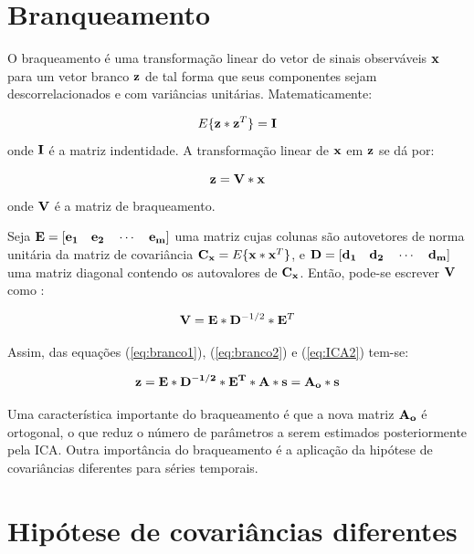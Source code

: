 \documentclass[a4paper,12pt]{monografia}
\theoremstyle{plain}
\theoremstyle{definition}
\theoremstyle{remark}
\begin{document}
\section{Branqueamento}

 O braqueamento é uma transformação linear do vetor de sinais observáveis ${\bf x}$ para um vetor branco ${\bf z}$ de tal forma que seus componentes sejam descorrelacionados e com variâncias unitárias. Matematicamente:

\begin{equation}
    E\{{\bf z}*{\bf z}^{T}\}= {\bf I} 
    \label{eq:branco1}
\end{equation}
onde ${\bf I}$ é a matriz indentidade. A transformação linear de ${\bf x}$ em ${\bf z}$ se dá por:

\begin{equation}
    {\bf z}= {\bf V}*{\bf x} 
    \label{eq:branco1}
\end{equation}
onde ${\bf V}$ é a matriz de braqueamento. 

Seja ${\bf E=[e_{1} \quad e_{2}\quad \cdots \quad e_{m}]}$ uma matriz cujas colunas são autovetores de norma unitária da matriz de covariância ${\bf C_{x}}=E\{{\bf x*x}^{T}\}$, e ${\bf D=[d_{1} \quad d_{2} \quad \cdots \quad d_{m}]}$ uma matriz diagonal contendo os autovalores de ${\bf C_{x}}$. Então, pode-se escrever ${\bf V}$ como \cite{hyvarinen2004independent}:

\begin{equation}
    {\bf V}= {\bf E}*{\bf D}^{-1/2}*{\bf E}^{T} 
    \label{eq:branco2}
\end{equation}

Assim, das equações (\ref{eq:branco1}), (\ref{eq:branco2}) e (\ref{eq:ICA2}) tem-se:

\begin{equation}
    {\bf z} = {\bf E*D^{-1/2}*E^{T}*A*s = A_{o}*s}
    \label{eq:branco3}
\end{equation}

Uma característica importante do braqueamento é que a nova matriz $\bf{A_{o}}$ é ortogonal, o que reduz o número de parâmetros a serem estimados posteriormente pela ICA. Outra importância do braqueamento é a aplicação da hipótese de covariâncias diferentes para séries temporais.

\section{Hipótese de covariâncias diferentes}
\end{document}
